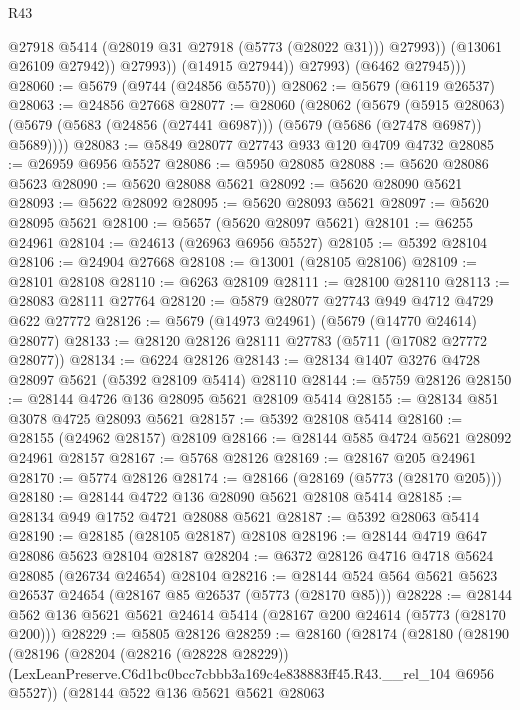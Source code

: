 \begin{lexlean}{R43}
\begin{coremodule}
                      @27918
                      @5414
                      (@28019 @31 @27918 (@5773 (@28022 @31)))
                      @27993))
                  (@13061 @26109 @27942))
                @27993))
            (@14915 @27944))
          @27993)
        (@6462 @27945)))
@28060 := @5679 (@9744 (@24856 @5570))
@28062 := @5679 (@6119 @26537)
@28063 := @24856 @27668
@28077 := @28060
    (@28062
      (@5679
        (@5915 @28063)
        (@5679 (@5683 (@24856 (@27441 @6987))) (@5679 (@5686 (@27478 @6987)) @5689))))
@28083 := @5849 @28077 @27743 @933 @120 @4709 @4732
@28085 := @26959 @6956 @5527
@28086 := @5950 @28085
@28088 := @5620 @28086 @5623
@28090 := @5620 @28088 @5621
@28092 := @5620 @28090 @5621
@28093 := @5622 @28092
@28095 := @5620 @28093 @5621
@28097 := @5620 @28095 @5621
@28100 := @5657 (@5620 @28097 @5621)
@28101 := @6255 @24961
@28104 := @24613 (@26963 @6956 @5527)
@28105 := @5392 @28104
@28106 := @24904 @27668
@28108 := @13001 (@28105 @28106)
@28109 := @28101 @28108
@28110 := @6263 @28109
@28111 := @28100 @28110
@28113 := @28083 @28111 @27764
@28120 := @5879 @28077 @27743 @949 @4712 @4729 @622 @27772
@28126 := @5679 (@14973 @24961) (@5679 (@14770 @24614) @28077)
@28133 := @28120 @28126 @28111 @27783 (@5711 (@17082 @27772 @28077))
@28134 := @6224 @28126
@28143 := @28134 @1407 @3276 @4728 @28097 @5621 (@5392 @28109 @5414) @28110
@28144 := @5759 @28126
@28150 := @28144 @4726 @136 @28095 @5621 @28109 @5414
@28155 := @28134 @851 @3078 @4725 @28093 @5621
@28157 := @5392 @28108 @5414
@28160 := @28155 (@24962 @28157) @28109
@28166 := @28144 @585 @4724 @5621 @28092 @24961 @28157
@28167 := @5768 @28126
@28169 := @28167 @205 @24961
@28170 := @5774 @28126
@28174 := @28166 (@28169 (@5773 (@28170 @205)))
@28180 := @28144 @4722 @136 @28090 @5621 @28108 @5414
@28185 := @28134 @949 @1752 @4721 @28088 @5621
@28187 := @5392 @28063 @5414
@28190 := @28185 (@28105 @28187) @28108
@28196 := @28144 @4719 @647 @28086 @5623 @28104 @28187
@28204 := @6372 @28126 @4716 @4718 @5624 @28085 (@26734 @24654) @28104
@28216 := @28144 @524 @564 @5621 @5623 @26537 @24654 (@28167 @85 @26537 (@5773 (@28170 @85)))
@28228 := @28144 @562 @136 @5621 @5621 @24614 @5414 (@28167 @200 @24614 (@5773 (@28170 @200)))
@28229 := @5805 @28126
@28259 := @28160
    (@28174
      (@28180
        (@28190
          (@28196
            (@28204
              (@28216 (@28228 @28229))
              (LexLeanPreserve.C6d1bc0bcc7cbbb3a169c4e838883ff45.R43.__rel_104 @6956 @5527))
            (@28144
              @522
              @136
              @5621
              @5621
              @28063

\end{coremodule}
\end{lexlean}
